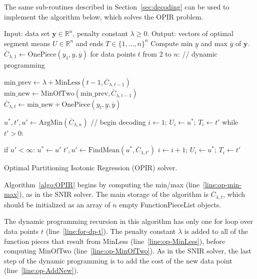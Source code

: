 \documentclass{article}
\newcommand{\RR}{\mathbb R}
\begin{document}
The same sub-routines described in Section~\ref{sec:decoding} can be
used to implement the algorithm below, which solves the OPIR problem.

\begin{algorithm}[H]
\begin{algorithmic}[1]
\STATE Input: data set $\mathbf y\in\RR^n$, penalty constant $\lambda\geq 0$.
\STATE Output: vectors of optimal segment means $U\in\RR^{n}$ and ends $T\in\{1,\dots,n\}^{n}$
\STATE Compute min $\underline y$ and max $\overline y$ of $\mathbf y$.
\label{line:op-min-max}
\STATE $\overline C_{\lambda,1}\gets \text{OnePiece}(y_1, \underline y, \overline y)$
\STATE for data points $t$ from 2 to $n$: // dynamic programming
\label{line:for-dp-t}
\begin{ALC@g}
  \STATE $\text{min\_prev}\gets \lambda + \text{MinLess}(t-1, \overline C_{\lambda,t-1})$
  \label{line:op-MinLess}
  \STATE $\text{min\_new}\gets \text{MinOfTwo}(\text{min\_prev}, \overline C_{\lambda, t-1})$
  \label{line:op-MinOfTwo}
  \STATE $\overline C_{\lambda,t}\gets \text{min\_new} + \text{OnePiece}(y_t, \underline y, \overline y)$
  \label{line:op-AddNew}
\end{ALC@g}
\STATE $u^*,t',u'\gets \text{ArgMin}(\overline C_{\lambda,n})$ // begin decoding
\label{line:op-ArgMin}
\STATE $i\gets 1;\, U_{i}\gets u^*;\, T_{i}\gets t'$
\label{line:op-store-i}
\STATE while $t' > 0$:
\begin{ALC@g}
  \STATE if $u' < \infty$: $u^*\gets u'$
  \STATE $t',u'\gets\text{FindMean}(u^*, \overline C_{\lambda,t'})$
  \STATE $i\gets i+1;\, U_{i}\gets u^*;\, T_{i}\gets t'$
\label{line:op-i+1}
\end{ALC@g}
\caption{\label{algo:OPIR}Optimal Partitioning Isotonic Regression (OPIR) solver.}
\end{algorithmic}
\end{algorithm}

Algorithm~\ref{algo:OPIR} begins by computing the min/max
(line~\ref{line:op-min-max}), as in the SNIR solver. The main storage
of the algorithm is $\overline C_{\lambda, t}$, which should be
initialized as an array of $n$ empty FunctionPieceList objects. 

The dynamic programming recursion in this algorithm has only one for
loop over data points $t$ (line~\ref{line:for-dp-t}). The penalty
constant $\lambda$ is added to all of the function pieces that result
from MinLess (line~\ref{line:op-MinLess}), before computing MinOfTwo
(line~\ref{line:op-MinOfTwo}). As in the SNIR solver, the last step of
the dynamic programming is to add the cost of the new data point
(line~\ref{line:op-AddNew}).
\end{document}
